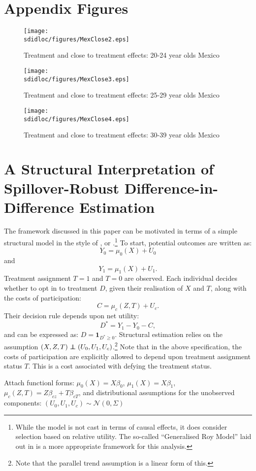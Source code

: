 \section{Appendix Figures}
\label{Sscn:Agraphs}
\begin{figure}[htpb!]
\texttt{[image: \\sdidloc/figures/MexClose2.eps]}
\caption{Treatment and close to treatment effects: 20-24 year olds Mexico}
\end{figure}
\begin{figure}[htpb!]
\texttt{[image: \\sdidloc/figures/MexClose3.eps]}
\caption{Treatment and close to treatment effects: 25-29 year olds Mexico}
\end{figure}
\begin{figure}[htpb!]
\texttt{[image: \\sdidloc/figures/MexClose4.eps]}
\caption{Treatment and close to treatment effects: 30-39 year olds Mexico}
\end{figure}

\section{A Structural Interpretation of Spillover-Robust Difference-in-Difference Estimation}
The framework discussed in this paper can be motivated in terms of a simple
structural model in the style of \citet{Roy1951}, or 
\citet{HeckmanVytlacil2005}.\footnote{While the \citet{Roy1951} model is not
cast in terms of causal effects, it does consider selection based on relative
utility.  The so-called ``Generalised Roy Model'' laid out in 
\citet{HeckmanVytlacil2005} is a more appropriate framework for this analysis.}
To start, potential outcomes are written as:
\[
Y_0= \mu_0(X) + U_0
\]
and
\[
Y_1= \mu_1(X) + U_1.
\]
Treatment assignment $T=1$ and $T=0$ are observed.  Each individual decides
whether to opt in to treatment $D$, given their realisation of $X$ and $T$,
along with the costs of participation:
\[
C=\mu_c(Z,T)+U_c.
\]
Their decision rule depends upon net utility:
\[
D^{*}=Y_1-Y_0-C,
\]
and can be expressed as: $D=\mathbf{1}_{D^{*}\geq 0}$.  Structural estimation
relies on the assumption $(X,Z,T) \independent (U_0,U_1,U_c)$.\footnote{Note
that the parallel trend assumption is a linear form of this.}  Note that in 
the above specification, the costs of participation are explicitly allowed 
to depend upon treatment assignment status $T$. This is a cost associated with
defying the treatment status.

Attach functionl forms: $\mu_0(X)=X\beta_0$, $\mu_1(X)=X\beta_1$, 
$\mu_c(Z,T)=Z\beta_{cz}+T\beta_{cT}$, and distributional assumptions for the
unobserved components: $(U_0,U_1,U_c)\sim \mathcal{N}(0,\Sigma)$ 



%
